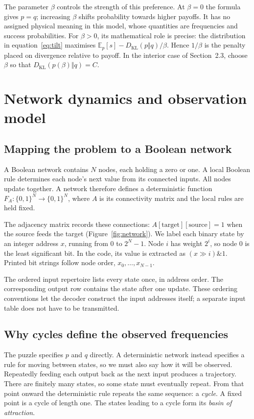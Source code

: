 \documentclass[11pt,a4paper]{article}
\newcommand{\KL}{D_{\mathrm{KL}}}
\newcommand{\E}{\mathbb{E}}
\newcommand{\bits}{\{0,1\}}
\begin{document}
The parameter $\beta$ controls the strength of this preference. At
$\beta=0$ the formula gives $p=q$; increasing $\beta$ shifts probability
towards higher payoffs. It has no assigned physical meaning in this
model, whose quantities are frequencies and success probabilities.
For $\beta>0$, its mathematical role is precise: the distribution in
equation~\eqref{eq:tilt} maximises
$\E_p[s]-\KL(p\Vert q)/\beta$. Hence $1/\beta$ is the penalty placed
on divergence relative to payoff. In the interior case of Section~2.3,
choose $\beta$ so that $\KL(p(\beta)\Vert q)=C$.

\section{Network dynamics and observation model}\label{app:dynamics}
\subsection{Mapping the problem to a Boolean network}
A Boolean network contains $N$ nodes, each holding a zero or one. A local
Boolean rule determines each node's next value from its connected inputs.
All nodes update together. A network therefore defines a deterministic
function $F_A:\bits^N\rightarrow\bits^N$, where $A$ is its connectivity
matrix and the local rules are held fixed.

The adjacency matrix records these connections:
$A[\text{target}][\text{source}]=1$ when the source feeds the target
(Figure~\ref{fig:network}). We label each binary state by an integer
address $x$, running from 0 to $2^N-1$. Node $i$ has weight $2^i$, so
node 0 is the least significant bit. In the code, its value is extracted
as $(x\mathbin{\gg}i)\mathbin{\&}1$. Printed bit strings follow node order,
$x_0,\ldots,x_{N-1}$.

The ordered input repertoire lists every state once, in address order.
The corresponding output row contains the state after one update.
These ordering conventions let the decoder construct the input addresses
itself; a separate input table does not have to be transmitted.

\subsection{Why cycles define the observed frequencies}
The puzzle specifies $p$ and $q$ directly. A deterministic network instead
specifies a rule for moving between states, so we must also say how it
will be observed. Repeatedly feeding each output back as the next input
produces a trajectory. There are finitely many states, so some state must
eventually repeat. From that point onward the deterministic rule repeats
the same sequence: a \emph{cycle}. A fixed point is a cycle of length one.
The states leading to a cycle form its \emph{basin of attraction}.
\end{document}
